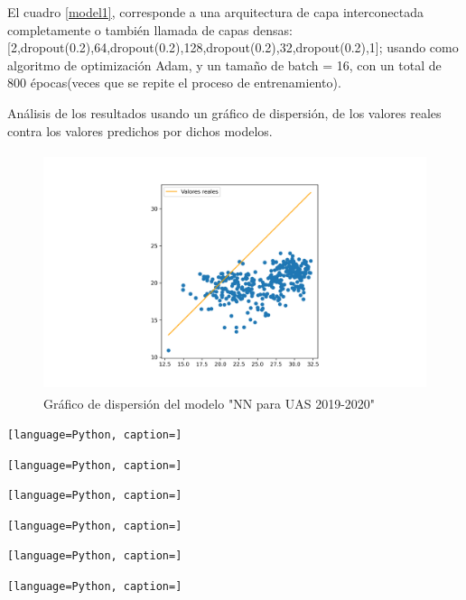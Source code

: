 El cuadro \ref{model1}, corresponde a una arquitectura  de capa interconectada
completamente o también llamada de capas densas:
[2,dropout(0.2),64,dropout(0.2),128,dropout(0.2),32,dropout(0.2),1]; usando
como algoritmo de optimización Adam, y un tamaño de batch = 16, con un total de
800 épocas(veces que se repite el proceso de entrenamiento).

Análisis de los resultados usando un gráfico de dispersión, de los valores
reales contra los valores predichos por dichos modelos. 

\begin{figure}[H]
    \centering
    \includegraphics[width=\textwidth, keepaspectratio,
    height=7cm]{images/resultados-modelo1-dispersion.png}
    \caption{Gráfico de dispersión del modelo "NN para UAS 2019-2020"}
    \label{fig:dispersion-resultados-uas}
\end{figure}


\begin{lstlisting}[language=Python, caption=]

\end{lstlisting}

\begin{lstlisting}[language=Python, caption=]

\end{lstlisting}
\begin{lstlisting}[language=Python, caption=]

\end{lstlisting}
\begin{lstlisting}[language=Python, caption=]

\end{lstlisting}
\begin{lstlisting}[language=Python, caption=]

\end{lstlisting}
\begin{lstlisting}[language=Python, caption=]

\end{lstlisting}
